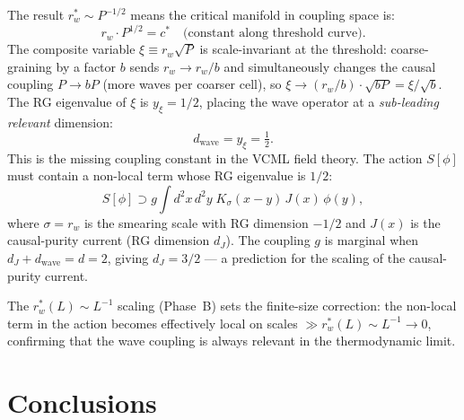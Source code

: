 \documentclass[twocolumn,10pt]{article}
\begin{document}
The result $r_w^*\sim P^{-1/2}$ means the critical manifold in coupling space is:
\begin{equation}
  r_w \cdot P^{1/2} = c^* \quad\text{(constant along threshold curve)}.
  \label{eq:manifold}
\end{equation}
The composite variable $\xi\equiv r_w\sqrt{P}$ is scale-invariant at the
threshold: coarse-graining by a factor $b$ sends $r_w\to r_w/b$ and
simultaneously changes the causal coupling $P\to bP$ (more waves per coarser
cell), so $\xi\to(r_w/b)\cdot\sqrt{bP}=\xi/\sqrt{b}$.
The RG eigenvalue of $\xi$ is $y_\xi=1/2$, placing the wave operator at a
\emph{sub-leading relevant} dimension:
\begin{equation}
  d_\mathrm{wave} = y_\xi = \tfrac{1}{2}.
  \label{eq:dwave}
\end{equation}
This is the missing coupling constant in the VCML field theory.
The action $S[\phi]$ must contain a non-local term whose RG eigenvalue is $1/2$:
\begin{equation}
  S[\phi] \supset g \int d^2x\, d^2y\; K_\sigma(x-y)\, J(x)\,\phi(y),
  \label{eq:action}
\end{equation}
where $\sigma = r_w$ is the smearing scale with RG dimension $-1/2$ and
$J(x)$ is the causal-purity current (RG dimension $d_J$).
The coupling $g$ is marginal when $d_J+d_\mathrm{wave}=d=2$,
giving $d_J=3/2$ --- a prediction for the scaling of the causal-purity current.

The $r_w^*(L)\sim L^{-1}$ scaling (Phase~B) sets the finite-size correction:
the non-local term in the action becomes effectively local on scales
$\gg r_w^*(L)\sim L^{-1}\to0$, confirming that the wave coupling is always
relevant in the thermodynamic limit.

\section{Conclusions}
\end{document}
